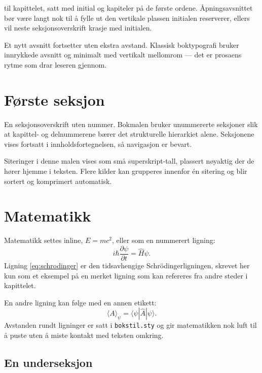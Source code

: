 
til kapittelet, satt med initial og kapiteler på de første ordene. Åpningsavsnittet bør være langt nok til å fylle ut den vertikale plassen initialen reserverer, ellers vil neste seksjonsoverskrift krasje med initialen.

Et nytt avsnitt fortsetter uten ekstra avstand. Klassisk boktypografi bruker innrykkede avsnitt og minimalt med vertikalt mellomrom --- det er prosaens rytme som drar leseren gjennom.


\section{Første seksjon}

En seksjonsoverskrift uten nummer. Bokmalen bruker unummererte seksjoner slik at kapittel- og delnummerene bærer det strukturelle hierarkiet alene. Seksjonene vises fortsatt i innholdsfortegnelsen, så navigasjon er bevart.

Siteringer i denne malen vises som små superskript-tall, plassert nøyaktig der de hører hjemme i teksten\cite{example-article}. Flere kilder kan grupperes innenfor én sitering og blir sortert og komprimert automatisk\cite{example-article,example-book}.


\section{Matematikk}

Matematikk settes inline, $E = mc^2$, eller som en nummerert ligning:
\begin{equation}
  i\hbar \frac{\partial \psi}{\partial t}
  = \hat{H}\psi.
  \label{eq:schrodinger}
\end{equation}
Ligning \eqref{eq:schrodinger} er den tidsavhengige Schr\"odingerligningen, skrevet her kun som et eksempel på en merket ligning som kan refereres fra andre steder i kapittelet.

En andre ligning kan følge med en annen etikett:
\begin{equation}
  \langle A \rangle_\psi = \langle \psi | \hat{A} | \psi \rangle.
  \label{eq:forventning}
\end{equation}
Avstanden rundt ligninger er satt i \texttt{bokstil.sty} og gir matematikken nok luft til å puste uten å miste kontakt med teksten omkring.

\subsection{En underseksjon}

